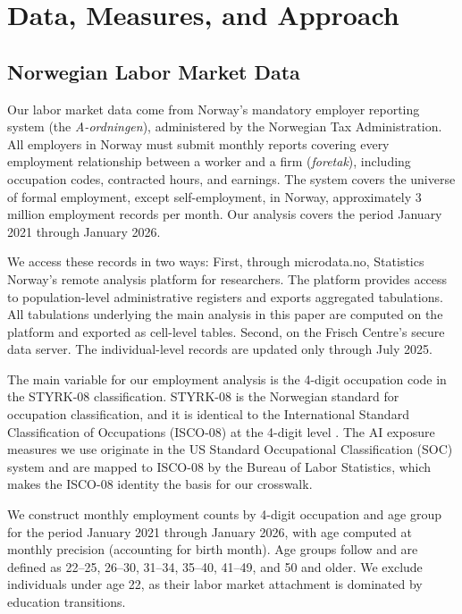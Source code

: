 \section{Data, Measures, and Approach}\label{sec:data}

\subsection{Norwegian Labor Market Data}\label{sec:data:labor}

Our labor market data come from Norway's mandatory employer reporting system (the \emph{A-ordningen}), administered by the Norwegian Tax Administration. All employers in Norway must submit monthly reports covering every employment relationship between a worker and a firm (\emph{foretak}), including occupation codes, contracted hours, and earnings. The system covers the universe of formal employment, except self-employment, in Norway, approximately 3 million employment records per month. Our analysis covers the period January 2021 through January 2026.

We access these records in two ways: First, through microdata.no, Statistics Norway's remote analysis platform for researchers. The platform provides access to population-level administrative registers and exports aggregated tabulations. All tabulations underlying the main analysis in this paper are computed on the platform and exported as cell-level tables. Second, on the Frisch Centre's secure data server. The individual-level records are updated only through July 2025.

The main variable for our employment analysis is the 4-digit occupation code in the STYRK-08 classification. STYRK-08 is the Norwegian standard for occupation classification, and it is identical to the International Standard Classification of Occupations (ISCO-08) at the 4-digit level \citep{ssb2011styrk}. The AI exposure measures we use originate in the US Standard Occupational Classification (SOC) system and are mapped to ISCO-08 by the Bureau of Labor Statistics, which makes the ISCO-08 identity the basis for our crosswalk.

We construct monthly employment counts by 4-digit occupation and age group for the period January 2021 through January 2026, with age computed at monthly precision (accounting for birth month). Age groups follow \citet{brynjolfsson2025} and are defined as 22--25, 26--30, 31--34, 35--40, 41--49, and 50 and older. We exclude individuals under age 22, as their labor market attachment is dominated by education transitions.

